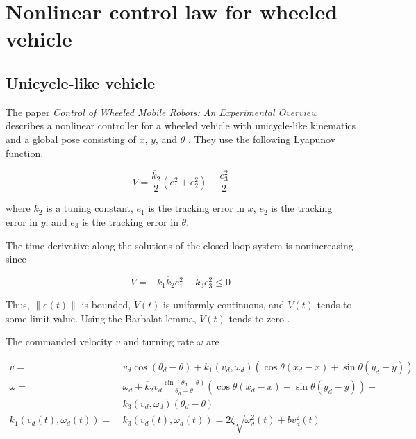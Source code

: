 \section{Nonlinear control law for wheeled vehicle}

\subsection{Unicycle-like vehicle}

The paper \textit{Control of Wheeled Mobile Robots: An Experimental Overview}
describes a nonlinear controller for a wheeled vehicle with unicycle-like
kinematics and a global \gls{pose} consisting of $x$, $y$, and $\theta$
\cite{bib:ctrl_wheeled_mobile_robots}. They use the following Lyapunov function.

\begin{equation*}
  V = \frac{\overline{k}_2}{2}(e_1^2 + e_2^2) + \frac{e_3^2}{2}
\end{equation*}

where $\overline{k}_2$ is a tuning constant, $e_1$ is the tracking error in $x$,
$e_2$ is the tracking error in $y$, and $e_3$ is the tracking error in $\theta$.

The time derivative along the solutions of the closed-loop \gls{system} is
nonincreasing since

\begin{equation*}
  \dot{V} = -k_1 \overline{k}_2 e_1^2 - k_3 e_3^2 \leq 0
\end{equation*}

Thus, $\lVert e(t) \rVert$ is bounded, $\dot{V}(t)$ is uniformly continuous,
and $V(t)$ tends to some limit value. Using the Barbalat lemma, $\dot{V}(t)$
tends to zero \cite{bib:ctrl_wheeled_mobile_robots}.

The commanded velocity $v$ and turning rate $\omega$ are

\begin{align}
  v =~& v_d \cos(\theta_d - \theta) + k_1(v_d, \omega_d)(\cos\theta(x_d - x) +
    \sin\theta(y_d - y)) \\
  \omega =~& \omega_d +
    \overline{k}_2 v_d\frac{\sin(\theta_d - \theta)}{\theta_d - \theta}
    (\cos\theta(x_d - x) - \sin\theta(y_d - y)) + \nonumber \\
    &k_3 (v_d, \omega_d)(\theta_d - \theta) \\
  k_1(v_d(t), \omega_d(t)) =~& k_3(v_d(t), \omega_d(t)) =
    2\zeta\sqrt{\omega_d^2(t) + bv_d^2(t)}
\end{align}

